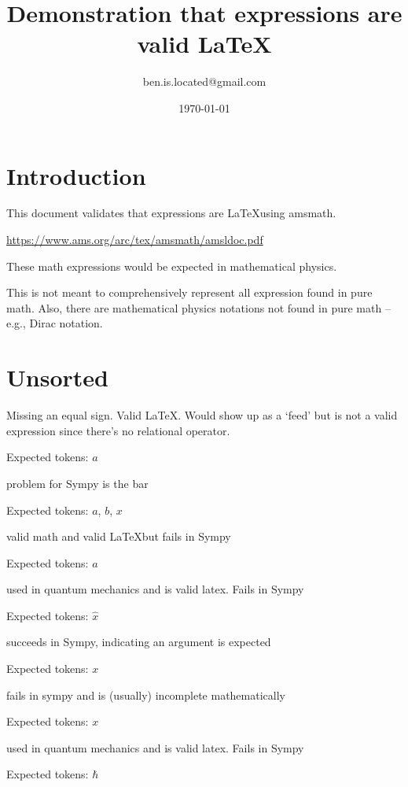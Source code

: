 \documentclass{article}
\title{Demonstration that expressions are valid \LaTeX}
\author{ben.is.located@gmail.com}
\date{\today}
\begin{document}
\maketitle

\section{Introduction}
This document validates that expressions are \LaTeX using amsmath. 

\href{https://www.ams.org/arc/tex/amsmath/amsldoc.pdf}{https://www.ams.org/arc/tex/amsmath/amsldoc.pdf}

These math expressions would be expected in mathematical physics.

This is not meant to comprehensively represent all expression found in pure math. Also, there are mathematical physics notations not found in pure math -- e.g., Dirac notation.

\section{Unsorted}

Missing an equal sign. Valid \LaTeX. Would show up as a `feed' but is not a valid expression since there's no relational operator.

Expected tokens: $a$

\hrulefill

problem for Sympy is the bar

Expected tokens: $a$, $b$, $x$

\hrulefill

valid math and valid \LaTeX but fails in Sympy

Expected tokens: $a$

\hrulefill

used in quantum mechanics and is valid latex. Fails in Sympy

Expected tokens: $\hat{x}$

\hrulefill

succeeds in Sympy, indicating an argument is expected

Expected tokens: $x$

\hrulefill

fails in sympy and is (usually) incomplete mathematically

Expected tokens: $x$

\hrulefill

used in quantum mechanics and is valid latex. Fails in Sympy

Expected tokens: $\hbar$

\hrulefill
\end{document}
